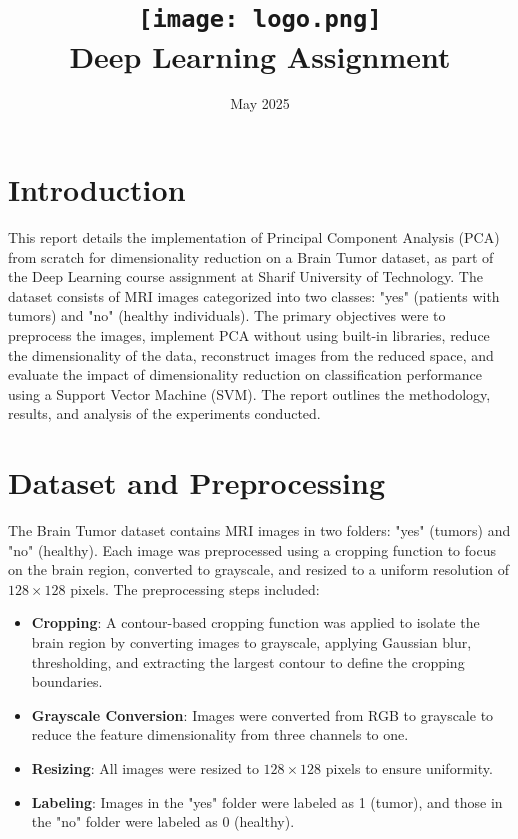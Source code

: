 \documentclass{article}
\title{
    \texttt{[image: logo.png]} \\
    Deep Learning Assignment \\ \exerciseset
}
\author{\FirstAuthor}
\date{May 2025}
\begin{document}
\maketitle

\section*{Introduction}

This report details the implementation of Principal Component Analysis (PCA) from scratch for dimensionality reduction on a Brain Tumor dataset, as part of the Deep Learning course assignment at Sharif University of Technology. The dataset consists of MRI images categorized into two classes: "yes" (patients with tumors) and "no" (healthy individuals). The primary objectives were to preprocess the images, implement PCA without using built-in libraries, reduce the dimensionality of the data, reconstruct images from the reduced space, and evaluate the impact of dimensionality reduction on classification performance using a Support Vector Machine (SVM). The report outlines the methodology, results, and analysis of the experiments conducted.

\section*{Dataset and Preprocessing}

The Brain Tumor dataset contains MRI images in two folders: "yes" (tumors) and "no" (healthy). Each image was preprocessed using a cropping function to focus on the brain region, converted to grayscale, and resized to a uniform resolution of $128 \times 128$ pixels. The preprocessing steps included:

\begin{itemize}
    \item \textbf{Cropping}: A contour-based cropping function was applied to isolate the brain region by converting images to grayscale, applying Gaussian blur, thresholding, and extracting the largest contour to define the cropping boundaries.
    \item \textbf{Grayscale Conversion}: Images were converted from RGB to grayscale to reduce the feature dimensionality from three channels to one.
    \item \textbf{Resizing}: All images were resized to $128 \times 128$ pixels to ensure uniformity.
    \item \textbf{Labeling}: Images in the "yes" folder were labeled as 1 (tumor), and those in the "no" folder were labeled as 0 (healthy).
\end{itemize}
\end{document}
